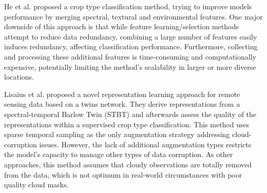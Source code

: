 \documentclass[journal,article,submit,pdftex,moreauthors]{Definitions/mdpi}
\begin{document}
He et al. \cite{He2022} proposed a crop type classification method, trying to improve models performance by merging spectral, textural and environmental features. One major downside of this approach is that while feature learning/selection methods attempt to reduce data redundancy, combining a large number of features easily induces redundancy, affecting classification performance. 
Furthermore, collecting and processing these additional features is time-consuming and computationally expensive, potentially limiting the method's scalability in larger or more diverse locations. 

Lisaius et al. \cite{Lisaius2024} proposed a novel representation learning approach for remote sensing data based on a twins network.
They derive representations from a spectral-temporal Barlow Twin (STBT) and afterwards assess the quality of the representations within a supervised crop type classification. This method uses sparse temporal sampling as the only augmentation strategy addressing cloud-corruption issues. However, the lack of additional augmentation types restricts the model's capacity to manage other types of data corruption. As other approaches, this method assumes that cloudy observations are totally removed from the data, which is not optimum in real-world circumstances with poor quality cloud masks.
\end{document}
